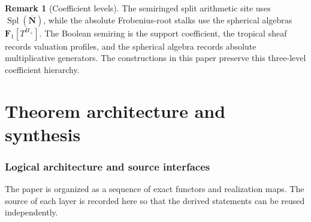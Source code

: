 \documentclass[11pt]{amsart}
\numberwithin{equation}{section}
\theoremstyle{definition}
\newtheorem{remark}[theorem]{Remark}
\newcommand{\N}{\mathbf N}
\newcommand{\Fone}{\mathbf F_1}
\newcommand{\Spl}{\operatorname{Spl}}
\newcommand{\Nbar}{\overline{\N}}
\begin{document}
\begin{remark}[Coefficient levels]
The semiringed split arithmetic site uses $\Spl(\Nbar)$, while the absolute
Frobenius-root stalks use the spherical algebras $\Fone[T^{H_+}]$.  The
Boolean semiring is the support coefficient, the tropical sheaf records
valuation profiles, and the spherical algebra records absolute
multiplicative generators.  The constructions in this paper preserve this
three-level coefficient hierarchy.
\end{remark}

\part{Theorem architecture and synthesis}

\section{Logical architecture and source interfaces}
\label{sec:construction-architecture}

The paper is organized as a sequence of exact functors and realization
maps.  The source of each layer is recorded here so that the derived
statements can be reused independently.
\end{document}
